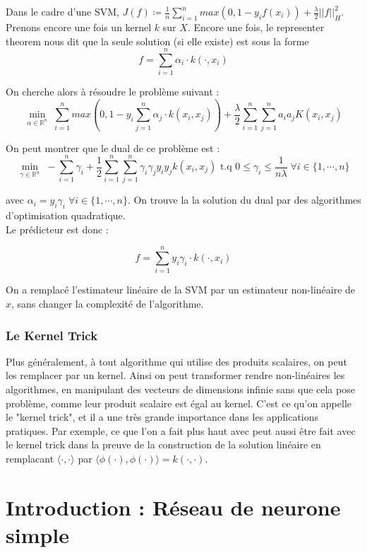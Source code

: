 \documentclass[a4paper, 11pt, french]{article}
\theoremstyle{definition}
\begin{document}
	Dans le cadre d'une SVM, $J(f) \coloneqq \frac{1}{n} \sum_{i=1}^{n} max(0, 1 - y_i f(x_i)) + \frac{\lambda}{2} ||f||_H^2$. Prenons encore une fois un kernel $k$ sur $X$. Encore une fois, le representer theorem nous dit que la seule solution (si elle existe) est sous la forme
	\[f = \sum_{i=1}^{n} \alpha_i \cdot k(\cdot, x_i)\]
	
	On cherche alors à résoudre le problème suivant :
	\[\min_{\alpha \in \mathbb{R}^n} \; \sum_{i=1}^{n} max(0, 1 - y_i \sum_{j=1}^{n} \alpha_j \cdot k(x_i, x_j))  + \frac{\lambda}{2} \sum_{i=1}^{n} \sum_{j=1}^{n} a_i a_j K(x_i, x_j)\]
	
	 On peut montrer que le dual de ce problème est :
	\[\min_{\gamma \in \mathbb{R}^n} \; -\sum_{i=1}^{n} \gamma_i + \frac{1}{2} \sum_{i=1}^{n} \sum_{j=1}^{n} \gamma_i \gamma_j y_i y_j k(x_i, x_j) \text{ t.q } 0 \leq \gamma_i \leq \frac{1}{n \lambda} \; \forall i \in \{1, \cdots, n\}\]
	
	avec $\alpha_i = y_i \gamma_i \; \forall i \in \{1, \cdots, n\}$. On trouve la la solution du dual par des algorithmes d'optimisation quadratique. \\
	
	Le prédicteur est donc :
	
	\[f = \sum_{i=1}^{n} y_i \gamma_i \cdot k(\cdot, x_i)\]
	
	On a remplacé l'estimateur linéaire de la SVM par un estimateur non-linéaire de $x$, sans changer la complexité de l'algorithme.
	
	\subsubsection{Le Kernel Trick}
	
	Plus généralement, à tout algorithme qui utilise des produits scalaires, on peut les remplacer par un kernel. Ainsi on peut transformer rendre non-linéaires les algorithmes, en manipulant des vecteurs de dimensions infinie sans que cela pose problème, comme leur produit scalaire est égal au kernel. C'est ce qu'on appelle le "kernel trick", et il a une très grande importance dans les applications pratiques. Par exemple, ce que l'on a fait plus haut avec peut aussi être fait avec le kernel trick dans la preuve de la construction de la solution linéaire en remplacant $\langle \cdot, \cdot \rangle$ par $\langle \phi(\cdot), \phi(\cdot) \rangle = k(\cdot, \cdot)$.
	
	
	
	\section{Introduction : Réseau de neurone simple}
	
\end{document}
